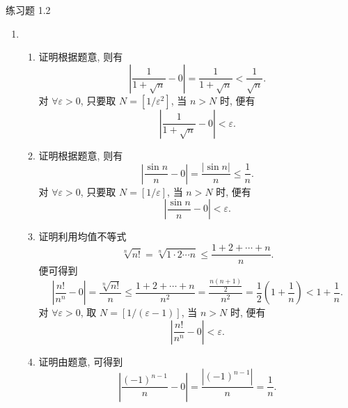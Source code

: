 



% 

\begin{center}
    {\heiti 练习题 1.2}
\end{center}

\begin{enumerate}
    \item %
        \begin{enumerate}[(1)]
            \item %
                {\heiti 证明}\quad 根据题意, 则有
                \[
                    \left|\frac{1}{1+\sqrt{n}} - 0\right| = \frac{1}{1+\sqrt{n}} < \frac{1}{\sqrt{n}}.    
                \]
                对 $\forall\varepsilon > 0$, 只要取 $N = [1/\varepsilon^2]$, 当 $n > N$ 时, 便有
                \[
                    \left|\frac{1}{1+\sqrt{n}} - 0\right| < \varepsilon. 
                \]
            \item %
                {\heiti 证明}\quad 根据题意, 则有
                \[
                    \left|\frac{\sin n}{n} - 0\right| = \frac{|\sin n|}{n} \leqslant \frac1n.    
                \]
                对 $\forall\varepsilon > 0$, 只要取 $N = [1/\varepsilon]$, 当 $n > N$ 时, 便有
                \[
                    \left|\frac{\sin n}{n} - 0\right| < \varepsilon.    
                \]
            \item %
                {\heiti 证明}\quad 利用均值不等式
                \[
                    \sqrt[n]{n!} = \sqrt[n]{1\cdot2\cdots n} \leqslant \frac{1 + 2 + \cdots + n}{n}.   
                \]
                便可得到
                \[
                    \left|\frac{n!}{n^n} - 0\right| = \frac{\sqrt[n]{n!}}{n} \leqslant \frac{1+2+\cdots+n}{n^2} = \frac{\frac{n(n+1)}{2}}{n^2} = \frac12\left(1 + \frac1n\right) < 1 + \frac1n.
                \]
                对 $\forall\varepsilon > 0$, 取 $N = [1/(\varepsilon-1)]$, 当 $n > N$ 时, 便有
                \[
                    \left|\frac{n!}{n^n} - 0\right| < \varepsilon.   
                \]
            \item %
                {\heiti 证明}\quad 由题意, 可得到
                \[
                    \left|\frac{(-1)^{n-1}}{n} - 0\right| = \frac{|(-1)^{n-1}|}{n} = \frac1n.    
\]
\end{enumerate}
\end{enumerate}
